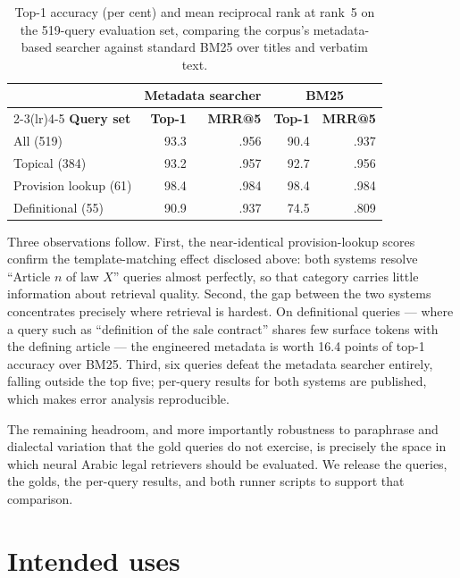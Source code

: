 \documentclass[sn-basic]{sn-jnl}%
\begin{document}
\begin{table}[t]
\centering
\small
\begin{tabular}{lrrrr}
\toprule
 & \multicolumn{2}{c}{\textbf{Metadata searcher}} & \multicolumn{2}{c}{\textbf{BM25}} \\
\cmidrule(lr){2-3}\cmidrule(lr){4-5}
\textbf{Query set} & \textbf{Top-1} & \textbf{MRR@5} & \textbf{Top-1} & \textbf{MRR@5} \\
\midrule
All (519) & 93.3 & .956 & 90.4 & .937 \\
Topical (384) & 93.2 & .957 & 92.7 & .956 \\
Provision lookup (61) & 98.4 & .984 & 98.4 & .984 \\
Definitional (55) & 90.9 & .937 & 74.5 & .809 \\
\bottomrule
\end{tabular}
\caption{Top-1 accuracy (per cent) and mean reciprocal rank at rank~5 on the
519-query evaluation set, comparing the corpus's metadata-based searcher
against standard BM25 over titles and verbatim text.}
\label{tab:baseline}
\end{table}

Three observations follow. First, the near-identical provision-lookup scores
confirm the template-matching effect disclosed above: both systems resolve
``Article $n$ of law $X$'' queries almost perfectly, so that category carries
little information about retrieval quality. Second, the gap between the two
systems concentrates precisely where retrieval is hardest. On definitional
queries --- where a query such as ``definition of the sale contract'' shares
few surface tokens with the defining article --- the engineered metadata is
worth 16.4 points of top-1 accuracy over BM25. Third, six queries defeat the
metadata searcher entirely, falling outside the top five; per-query results
for both systems are published, which makes error analysis reproducible.

The remaining headroom, and more importantly robustness to paraphrase and
dialectal variation that the gold queries do not exercise, is precisely the
space in which neural Arabic legal retrievers should be evaluated. We
release the queries, the golds, the per-query results, and both runner
scripts to support that comparison.

\section{Intended uses}
\label{sec:uses}
\end{document}
